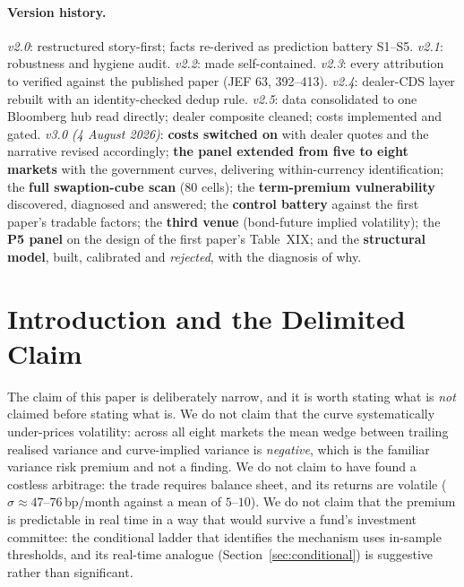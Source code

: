 \documentclass[11pt]{article}
\newcommand{\bp}{\,\mathrm{bp}}
\begin{document}
\paragraph{Version history.} \emph{v2.0}: restructured story-first; facts re-derived as prediction
battery S1--S5. \emph{v2.1}: robustness and hygiene audit. \emph{v2.2}: made self-contained.
\emph{v2.3}: every attribution to \citet{rr2021} verified against the published paper (JEF 63,
392--413). \emph{v2.4}: dealer-CDS layer rebuilt with an identity-checked dedup rule. \emph{v2.5}:
data consolidated to one Bloomberg hub read directly; dealer composite cleaned; costs implemented and
gated. \emph{v3.0 (4 August 2026)}: \textbf{costs switched on} with dealer quotes and the narrative
revised accordingly; \textbf{the panel extended from five to eight markets} with the government curves,
delivering within-currency identification; the \textbf{full swaption-cube scan} (80 cells); the
\textbf{term-premium vulnerability} discovered, diagnosed and answered; the \textbf{control battery}
against the first paper's tradable factors; the \textbf{third venue} (bond-future implied volatility);
the \textbf{P5 panel} on the design of the first paper's Table~XIX; and the \textbf{structural model},
built, calibrated and \emph{rejected}, with the diagnosis of why.

\section{Introduction and the Delimited Claim}\label{sec:intro}

The claim of this paper is deliberately narrow, and it is worth stating what is \emph{not} claimed
before stating what is. We do not claim that the curve systematically under-prices volatility: across
all eight markets the mean wedge between trailing realised variance and curve-implied variance is
\emph{negative}, which is the familiar variance risk premium and not a finding. We do not claim to have
found a costless arbitrage: the trade requires balance sheet, and its returns are volatile
($\sigma \approx 47$--$76\bp$/month against a mean of $5$--$10$). We do not claim that the premium is
predictable in real time in a way that would survive a fund's investment committee: the conditional
ladder that identifies the mechanism uses in-sample thresholds, and its real-time analogue
(Section~\ref{sec:conditional}) is suggestive rather than significant.
\end{document}
